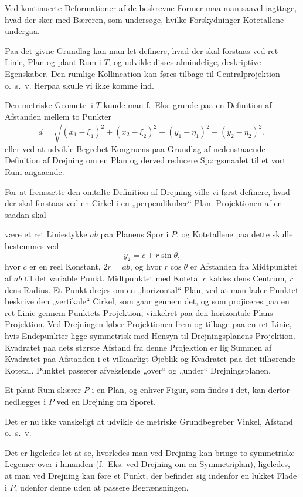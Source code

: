 \documentclass{article}
\begin{document}
Ved kontinuerte Deformationer af de beskrevne Former maa man saavel iagttage, hvad der sker med Bæreren, som undersøge, hvilke Forskydninger Kotetallene undergaa.

Paa det givne Grundlag kan man let definere, hvad der skal forstaas ved ret Linie, Plan og plant Rum i $T$, og udvikle disses almindelige, deskriptive Egenskaber. Den rumlige Kollineation kan føres tilbage til Centralprojektion o.~s.~v. Herpaa skulle vi ikke komme ind.

Den metriske Geometri i $T$ kunde man f.~Eks. grunde paa en Definition af Afstanden mellem to Punkter
\[
d = \sqrt{(x_1 - \xi_1)^2 + (x_2 - \xi_2)^2 + (y_1 - \eta_1)^2 + (y_2 - \eta_2)^2},
\]
eller ved at udvikle Begrebet Kongruens paa Grundlag af nedenstaaende Definition af Drejning om en Plan og derved reducere Spørgsmaalet til et vort Rum angaaende.

For at fremsætte den omtalte Definition af Drejning ville vi først definere, hvad der skal forstaas ved en Cirkel i en „perpendikulær“ Plan. Projektionen af en saadan skal

være et ret Liniestykke $ab$ paa Planens Spor i $P$, og Kotetallene paa dette skulle bestemmes ved
\[
y_2 = c \pm r \sin \theta,
\]
hvor $c$ er en reel Konstant, $2r = ab$, og hvor $r \cos \theta$ er Afstanden fra Midtpunktet af $ab$ til det variable Punkt. Midtpunktet med Kotetal $c$ kaldes dens Centrum, $r$ dens Radius. Et Punkt drejes om en „horizontal“ Plan, ved at man lader Punktet beskrive den „vertikale“ Cirkel, som gaar gennem det, og som projiceres paa en ret Linie gennem Punktets Projektion, vinkelret paa den horizontale Plans Projektion. Ved Drejningen løber Projektionen frem og tilbage paa en ret Linie, hvis Endepunkter ligge symmetrisk med Hensyn til Drejningsplanens Projektion. Kvadratet paa dets største Afstand fra denne Projektion er lig Summen af Kvadratet paa Afstanden i et vilkaarligt Øjeblik og Kvadratet paa det tilhørende Kotetal. Punktet passerer afvekslende „over“ og „under“ Drejningsplanen.

Et plant Rum skærer $P$ i en Plan, og enhver Figur, som findes i det, kan derfor nedlægges i $P$ ved en Drejning om Sporet.

Det er nu ikke vanskeligt at udvikle de metriske Grundbegreber Vinkel, Afstand o.~s.~v.

Det er ligeledes let at se, hvorledes man ved Drejning kan bringe to symmetriske Legemer over i hinanden (f.~Eks. ved Drejning om en Symmetriplan), ligeledes, at man ved Drejning kan føre et Punkt, der befinder sig indenfor en lukket Flade i $P$, udenfor denne uden at passere Begrænsningen.
\end{document}
